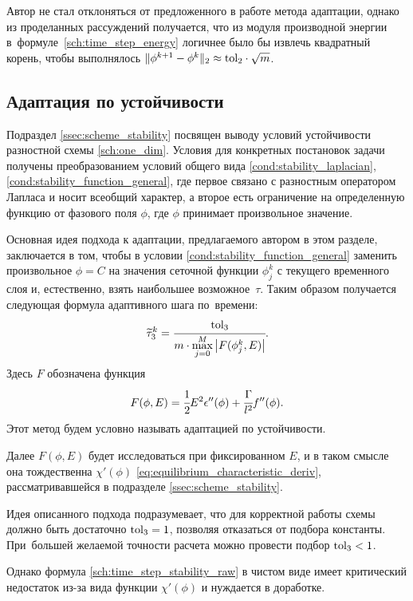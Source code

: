 Автор не стал отклоняться от предложенного в работе \cite{zhang_time_step} метода адаптации, однако из проделанных рассуждений получается, что из модуля производной энергии в~формуле~\eqref{sch:time_step_energy} логичнее было бы извлечь квадратный корень, чтобы выполнялось $\| \phi^{k + 1} \hm - \phi^k \|_2 \approx \tol_2 \cdot \sqrt{m}$.


\subsection{Адаптация по устойчивости}

Подраздел \ref{ssec:scheme_stability} посвящен выводу условий устойчивости разностной схемы \eqref{sch:one_dim}. Условия для конкретных постановок задачи получены преобразованием условий общего вида \eqref{cond:stability_laplacian}, \eqref{cond:stability_function_general}, где первое связано с разностным оператором Лапласа и носит всеобщий характер, а второе есть ограничение на определенную функцию от фазового поля $\phi$, где $\phi$ принимает произвольное значение.

Основная идея подхода к адаптации, предлагаемого автором в этом разделе, заключается в том, чтобы в условии \eqref{cond:stability_function_general} заменить произвольное $\phi = C$ на значения сеточной функции $\phi_j^k$ с текущего временного слоя и, естественно, взять наибольшее возможное~$\tau$. Таким образом получается следующая формула адаптивного шага по~времени:
\begin{equation}
    \widetilde{\tau}_3^k = \cfrac{{\text{tol}}_3}{m \cdot \max\limits_{j = 0}^M \left| F(\phi_j^k, E) \right|}.
    \label{sch:time_step_stability_raw}
\end{equation}
Здесь $F$ обозначена функция
\[
    F(\phi, E) = \cfrac{1}{2} E^2 \epsilon''(\phi) + \cfrac{\Gamma}{l^2} f''(\phi).
\]
Этот метод будем условно называть адаптацией по устойчивости.

Далее $F(\phi, E)$ будет исследоваться при фиксированном $E$, и в таком смысле она тождественна $\chi'(\phi)$ \eqref{eq:equilibrium_characteristic_deriv}, рассматривавшейся в подразделе \ref{ssec:scheme_stability}.

Идея описанного подхода подразумевает, что для корректной работы схемы \linebreak должно быть достаточно ${\text{tol}}_3 = 1$, позволяя отказаться от подбора константы. При~большей желаемой точности расчета можно провести подбор ${\text{tol}}_3 < 1$.

Однако формула \eqref{sch:time_step_stability_raw} в чистом виде имеет критический недостаток из-за вида функции $\chi'(\phi)$ и нуждается в доработке.

